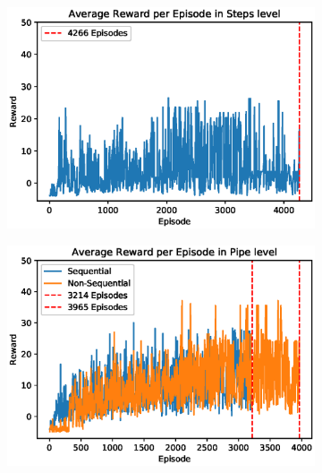 \documentclass[notitlepage,a4paper,11pt]{article}
\begin{document}
\begin{figure}[t]
     \centering
     \begin{subfigure}[t]{0.32\textwidth}
         \centering
         \includegraphics[width=\textwidth]{figs/dqn_results_1.eps}
         \caption{}
         \label{fig:dqn_results_1}
     \end{subfigure}
     \hfill
     \begin{subfigure}[t]{0.32\textwidth}
         \centering
         \includegraphics[width=\textwidth]{figs/dqn_results_2.eps}
         \caption{}
         \label{fig:dqn_results_2}
     \end{subfigure}
     \hfill
     \begin{subfigure}[t]{0.32\textwidth}
         \centering

\end{subfigure}
\end{figure}
\end{document}
